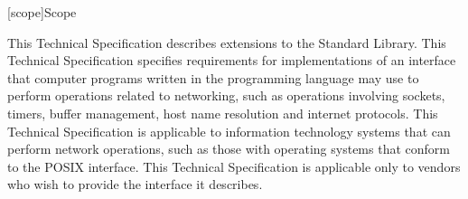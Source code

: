 
[scope]{Scope}

\pnum
 This Technical Specification describes extensions to the \Cpp Standard Library. This Technical Specification specifies requirements for implementations of an interface that computer programs written in the \Cpp programming language may use to perform operations related to networking, such as operations involving sockets, timers, buffer management, host name resolution and internet protocols. This Technical Specification is applicable to information technology systems that can perform network operations, such as those with operating systems that conform to the POSIX interface. This Technical Specification is applicable only to vendors who wish to provide the interface it describes.

